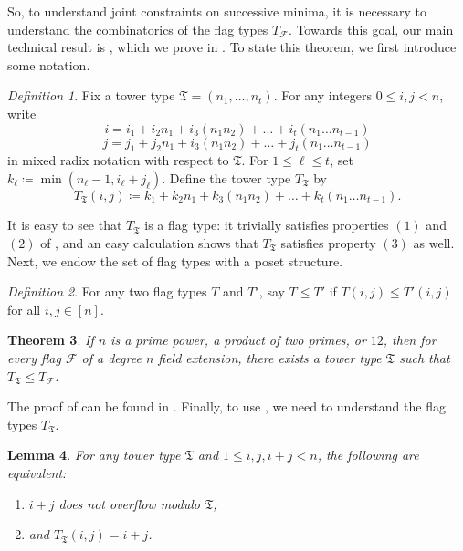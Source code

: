 \documentclass[letterpaper,10pt]{amsart}
\newcommand{\mfT}{\mathfrak{T}}
\newcommand{\cF}{\mathcal{F}}
\newtheorem{theorem}{Theorem}[section]
\newtheorem{lemma}[theorem]{Lemma}
\theoremstyle{definition}
\theoremstyle{remark}
\newtheorem{definition}[theorem]{Definition}
\begin{document}
So, to understand joint constraints on successive minima, it is necessary to understand the combinatorics of the flag types $T_{\cF}$. Towards this goal, our main technical result is , which we prove in . To state this theorem, we first introduce some notation. 

\begin{definition}
\label{def:T-mft}
Fix a tower type $\mfT = (n_1,\dots,n_t)$. For any integers $0 \leq i , j < n$, write
\[
	i = i_1 + i_2 n_1 + i_3 (n_1n_2) + \dots + i_t(n_1\dots n_{t-1})
\]
\[
	j = j_1 + j_2 n_1 + i_3 (n_1n_2) + \dots + j_t(n_1\dots n_{t-1})
\]
in mixed radix notation with respect to $\mfT$. For $1 \leq \ell \leq t$, set $k_{\ell} \coloneqq \min(n_{\ell}-1, i_{\ell} + j_{\ell})$. Define the tower type $T_{\mfT}$ by
\[
    T_{\mfT}(i,j) \coloneqq k_1 + k_2 n_1 + k_3 (n_1n_2) + \dots + k_t(n_1\dots n_{t-1}).
\]
\end{definition}

It is easy to see that $T_{\mfT}$ is a flag type: it trivially satisfies properties $(1)$ and $(2)$ of , and an easy calculation shows that $T_{\mfT}$ satisfies property $(3)$ as well. Next, we endow the set of flag types with a poset structure. 

\begin{definition}
For any two flag types $T$ and $T'$, say $T \leq T'$ if $T(i,j) \leq T'(i,j)$ for all $i,j \in [n]$.
\end{definition}

\begin{theorem}
\label{thm:flag-types}
If $n$ is a prime power, a product of two primes, or $12$, then for every flag $\cF$ of a degree $n$ field extension, there exists a tower type $\mfT$ such that $T_{\mfT} \leq T_{\cF}$.
\end{theorem}
The proof of  can be found in . Finally, to use , we need to understand the flag types $T_{\mfT}$.
\begin{lemma}
\label{cor:explicit-flag-type-basic}
For any tower type $\mfT$ and $1 \leq i,j,i+j < n$, the following are equivalent:
\begin{enumerate}
\item $i + j$ does not overflow modulo $\mfT$;
\item and $T_{\mfT}(i,j) = i+j$.
\end{enumerate}
\end{lemma}
\end{document}

